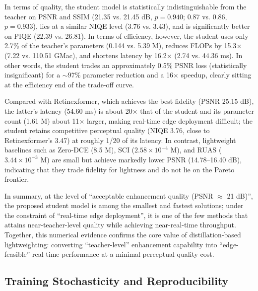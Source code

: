 \documentclass[sensors,article,submit,moreauthors]{Definitions/mdpi}
\begin{document}
In terms of quality, the student model is statistically indistinguishable from the teacher on PSNR and SSIM (21.35 vs. 21.45 dB, $p = 0.940$; 0.87 vs. 0.86, $p = 0.933$), lies at a similar NIQE level (3.76 vs. 3.43), and is significantly better on PIQE (22.39 vs. 26.81). In terms of efficiency, however, the student uses only 2.7\% of the teacher's parameters (0.144 vs. 5.39 M), reduces FLOPs by 15.3$\times$ (7.22 vs. 110.51 GMac), and shortens latency by 16.2$\times$ (2.74 vs. 44.36 ms). In other words, the student trades an approximately 0.5\% PSNR loss (statistically insignificant) for a $\sim$97\% parameter reduction and a 16$\times$ speedup, clearly sitting at the efficiency end of the trade-off curve.

Compared with Retinexformer, which achieves the best fidelity (PSNR 25.15 dB), the latter's latency (54.60 ms) is about 20$\times$ that of the student and its parameter count (1.61 M) about 11$\times$ larger, making real-time edge deployment difficult; the student retains competitive perceptual quality (NIQE 3.76, close to Retinexformer's 3.47) at roughly 1/20 of its latency. In contrast, lightweight baselines such as Zero-DCE (8.5 M), SCI ($2.58\times10^{-4}$ M), and RUAS ($3.44\times10^{-3}$ M) are small but achieve markedly lower PSNR (14.78--16.40 dB), indicating that they trade fidelity for lightness and do not lie on the Pareto frontier.

In summary, at the level of ``acceptable enhancement quality (PSNR $\approx$ 21 dB)'', the proposed student model is among the smallest and fastest solutions; under the constraint of ``real-time edge deployment'', it is one of the few methods that attains near-teacher-level quality while achieving near-real-time throughput. Together, this numerical evidence confirms the core value of distillation-based lightweighting: converting ``teacher-level'' enhancement capability into ``edge-feasible'' real-time performance at a minimal perceptual quality cost.

\subsection{Training Stochasticity and Reproducibility}
\end{document}
